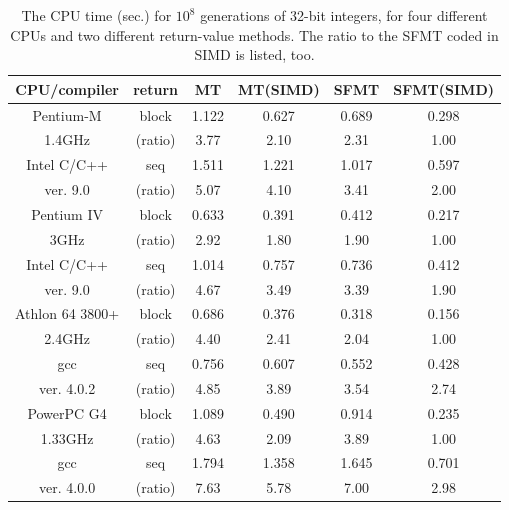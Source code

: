 \documentclass{svmult}
\begin{document}
\begin{table}
\begin{center}
\begin{tabular}{|c|c||c|c|c|c|} \hline
CPU/compiler & return & MT & MT(SIMD) & SFMT & SFMT(SIMD)  \\ \hline \hline
Pentium-M & block & 1.122  & 0.627  & 0.689  & 0.298 \\ \cline{3-6}
1.4GHz & (ratio) & 3.77  & 2.10  & 2.31  & 1.00 \\ \cline{2-6}
Intel C/C++ & seq & 1.511  & 1.221  & 1.017  & 0.597 \\ \cline{3-6}
ver. 9.0 & (ratio) & 5.07  & 4.10  & 3.41  & 2.00 \\ \hline
Pentium IV & block & 0.633  & 0.391  & 0.412  & 0.217 \\ \cline{3-6}
3GHz & (ratio) & 2.92  & 1.80  & 1.90  & 1.00 \\ \cline{2-6}
Intel C/C++ & seq & 1.014  & 0.757  & 0.736  & 0.412 \\ \cline{3-6}
ver. 9.0 & (ratio) & 4.67  & 3.49  & 3.39  & 1.90 \\ \hline
Athlon 64 3800+ & block & 0.686  & 0.376  & 0.318  & 0.156 \\ \cline{3-6}
2.4GHz & (ratio) & 4.40  & 2.41  & 2.04  & 1.00 \\ \cline{2-6}
gcc & seq & 0.756  & 0.607  & 0.552  & 0.428 \\ \cline{3-6}
ver. 4.0.2 & (ratio) & 4.85  & 3.89  & 3.54  & 2.74 \\ \hline
PowerPC G4 & block & 1.089  & 0.490  & 0.914  & 0.235 \\ \cline{3-6}
1.33GHz & (ratio) & 4.63  & 2.09  & 3.89  & 1.00 \\ \cline{2-6}
gcc & seq & 1.794  & 1.358  & 1.645  & 0.701 \\ \cline{3-6}
ver. 4.0.0 & (ratio) & 7.63  & 5.78  & 7.00  & 2.98 \\ \hline
\end{tabular}
\end{center}
\caption{The CPU time (sec.) for $10^8$ generations of 32-bit integers,
for four different CPUs and two different return-value methods. 
The ratio to the SFMT coded in SIMD is listed, too.}\label{tab:speed}
\end{table}
\end{document}
